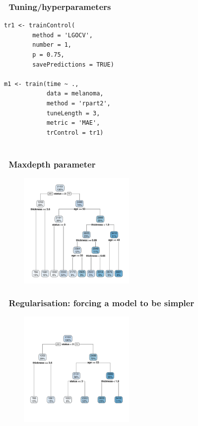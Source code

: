 \documentclass[handout, aspectratio = 169]{beamer}
\begin{document}
\begin{frame}[fragile]
\frametitle{\insertframenumber~Tuning/hyperparameters}
\renewcommand{\FancyVerbFormatLine}[1]{%
   \ifnum\value{FancyVerbLine}=10\color{cyan}#1%
   \else #1\fi}
\begin{Verbatim}
tr1 <- trainControl(
        method = 'LGOCV',
        number = 1,
        p = 0.75,
        savePredictions = TRUE)

m1 <- train(time ~ ., 
            data = melanoma,
            method = 'rpart2',
            tuneLength = 3,
            metric = 'MAE',
            trControl = tr1)
            
\end{Verbatim}

\end{frame} 




\begin{frame}
\frametitle{\insertframenumber~Maxdepth parameter}
\vspace{-4mm}
\begin{figure}
    \includegraphics[width = 0.5\textwidth]{rpart_depth6.pdf}
\end{figure} 

\end{frame} 




\begin{frame}
\frametitle{\insertframenumber~Regularisation: forcing a model to be simpler}
\vspace{-4mm}
\begin{figure}
    \includegraphics[width = 0.5\textwidth]{rpart_depth3.pdf}
\end{figure} 
\end{frame} 
\end{document}
